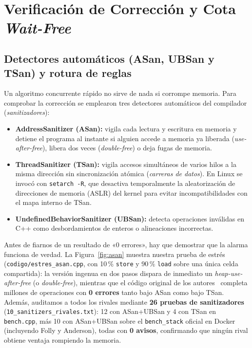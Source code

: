 \documentclass[11pt,a4paper]{article}
\begin{document}
\section{Verificación de Corrección y Cota \emph{Wait-Free}}

\subsection{Detectores automáticos (ASan, UBSan y TSan) y rotura de reglas}
Un algoritmo concurrente rápido no sirve de nada si corrompe memoria. Para comprobar la corrección se emplearon tres detectores automáticos del compilador (\emph{sanitizadores}):
\begin{itemize}
  \item \textbf{AddressSanitizer (ASan):} vigila cada lectura y escritura en memoria y detiene el programa al instante si alguien accede a memoria ya liberada (\emph{use-after-free}), libera dos veces (\emph{double-free}) o deja fugas de memoria.
  \item \textbf{ThreadSanitizer (TSan):} vigila accesos simultáneos de varios hilos a la misma dirección sin sincronización atómica (\emph{carreras de datos}). En Linux se invocó con \texttt{setarch -R}, que desactiva temporalmente la aleatorización de direcciones de memoria (ASLR) del kernel para evitar incompatibilidades con el mapa interno de TSan.
  \item \textbf{UndefinedBehaviorSanitizer (UBSan):} detecta operaciones inválidas en C++ como desbordamientos de enteros o alineaciones incorrectas.
\end{itemize}

Antes de fiarnos de un resultado de «0 errores», hay que demostrar que la alarma funciona de verdad. La Figura~\ref{fig:asan} muestra nuestra prueba de estrés (\texttt{codigo/estres\_asan.cpp}, con 10\,\% \texttt{store} y 90\,\% \texttt{load} sobre una única celda compartida): la versión ingenua en dos pasos dispara de inmediato un \emph{heap-use-after-free} (o \emph{double-free}), mientras que el código original de los autores~\cite{dewolff2024repo} completa millones de operaciones con \textbf{0 errores} tanto bajo ASan como bajo TSan. Además, auditamos a todos los rivales mediante \textbf{26 pruebas de sanitizadores} (\texttt{10\_sanitizers\_rivales.txt}): 12 con ASan+UBSan y 4 con TSan en \texttt{bench.cpp}, más 10 con ASan+UBSan sobre el \texttt{bench\_stack} oficial en Docker (incluyendo Folly y Anderson), todas con \textbf{0 avisos}, confirmando que ningún rival obtiene ventaja rompiendo la memoria.
\end{document}
